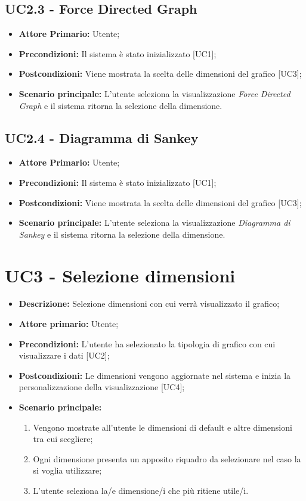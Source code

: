 \subsection{UC2.3 - Force Directed Graph}
\begin{itemize}
   \item \textbf{Attore Primario:} Utente;
   \item \textbf{Precondizioni:} Il sistema è stato inizializzato [UC1];
   \item \textbf{Postcondizioni:} Viene mostrata la scelta delle dimensioni del grafico [UC3];
   \item \textbf{Scenario principale:} L'utente seleziona la visualizzazione \textit{Force Directed Graph} e il sistema ritorna la selezione della dimensione.
\end{itemize}
\subsection{UC2.4 - Diagramma di Sankey}
\begin{itemize}
   \item \textbf{Attore Primario:} Utente;
   \item \textbf{Precondizioni:} Il sistema è stato inizializzato [UC1];
   \item \textbf{Postcondizioni:} Viene mostrata la scelta delle dimensioni del grafico [UC3];
   \item \textbf{Scenario principale:} L'utente seleziona la visualizzazione \textit{Diagramma di Sankey} e il sistema ritorna la selezione della dimensione.
\end{itemize}
\section{UC3 - Selezione dimensioni}
 \begin{itemize}
     \item \textbf{Descrizione:} Selezione dimensioni con cui verrà visualizzato il grafico;
     \item \textbf{Attore primario:} Utente;
     \item \textbf{Precondizioni:} L'utente ha selezionato la tipologia di grafico con cui visualizzare i dati [UC2];
     \item \textbf{Postcondizioni:} Le dimensioni vengono aggiornate nel sistema e inizia la personalizzazione della visualizzazione [UC4];
     \item \textbf{Scenario principale:}
     \begin{enumerate}
         \item Vengono mostrate all'utente le dimensioni di default e altre dimensioni tra cui scegliere;
         \item Ogni dimensione presenta un apposito riquadro da selezionare nel caso la si voglia utilizzare;
         \item L'utente seleziona la/e dimensione/i che più ritiene utile/i.
     \end{enumerate}
 \end{itemize}

